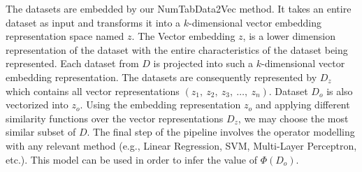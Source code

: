 The datasets are embedded by our NumTabData2Vec method. It takes an entire dataset as input and transforms it into a $k$-dimensional vector embedding representation space named $z$. The Vector embedding $z$, is a lower dimension representation of the dataset with the entire characteristics of the dataset being represented. Each dataset from $D$ is projected into such a $k$-dimensional vector embedding representation. The datasets are consequently represented by $D_z$ which contains all vector representations $\left( z_1,\ z_2,\ z_3,\ \ldots,\ z_n\right)$. Dataset $D_o$ is also vectorized into $z_o$. Using the embedding representation $z_o$ and applying different similarity functions over the vector representations $D_z$, we may choose the most similar subset of $D$. 
The final step of the pipeline involves the operator modelling with any relevant method (e.g., Linear Regression, SVM, Multi-Layer Perceptron, etc.). This model can be used in order to infer the value of $\Phi(D_o)$.







